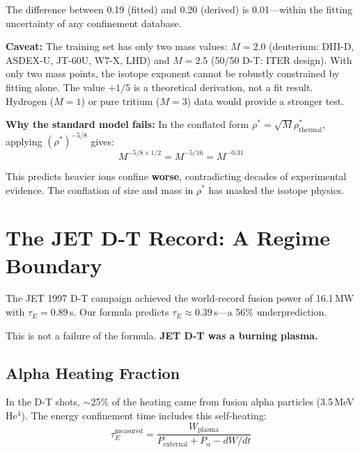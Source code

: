\documentclass[11pt,letterpaper]{article}
\newcommand{\tauE}{\tau_E}
\newcommand{\rhostar}{\rho^*}
\newcommand{\rhotherm}{\rho_{\text{thermal}}^*}
\begin{document}
The difference between 0.19 (fitted) and 0.20 (derived) is 0.01---within the fitting uncertainty of any confinement database.

\vspace{0.3em}
\textbf{Caveat:} The training set has only two mass values: $M = 2.0$ (deuterium: DIII-D, ASDEX-U, JT-60U, W7-X, LHD) and $M = 2.5$ (50/50 D-T: ITER design). With only two mass points, the isotope exponent cannot be robustly constrained by fitting alone. The value $+1/5$ is a theoretical derivation, not a fit result. Hydrogen ($M = 1$) or pure tritium ($M = 3$) data would provide a stronger test.

\vspace{0.3em}
\textbf{Why the standard model fails:} In the conflated form $\rhostar = \sqrt{M} \rhotherm$, applying $(\rhostar)^{-5/8}$ gives:
\begin{equation}
M^{-5/8 \times 1/2} = M^{-5/16} = M^{-0.31}
\end{equation}

This predicts heavier ions confine \textbf{worse}, contradicting decades of experimental evidence. The conflation of size and mass in $\rhostar$ has masked the isotope physics.

\section{The JET D-T Record: A Regime Boundary}

The JET 1997 D-T campaign achieved the world-record fusion power of 16.1\,MW with $\tauE = 0.89$\,s. Our formula predicts $\tauE \approx 0.39$\,s---a 56\% underprediction.

This is not a failure of the formula. \textbf{JET D-T was a burning plasma.}

\subsection{Alpha Heating Fraction}

In the D-T shots, $\sim$25\% of the heating came from fusion alpha particles (3.5\,MeV He$^4$). The energy confinement time includes this self-heating:
\begin{equation}
\tauE^{\text{measured}} = \frac{W_{\text{plasma}}}{P_{\text{external}} + P_{\alpha} - dW/dt}
\end{equation}
\end{document}
